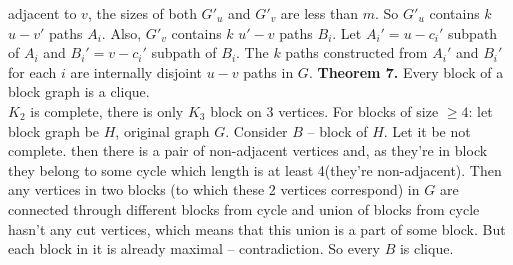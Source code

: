 \documentclass{article}
\begin{document}
	adjacent to $v$, the sizes of both $G'_u$ and $G'_v$ are less than $m$. So $G'_u$ contains $k$ $u-v'$ paths $A_i$. Also, $G'_v$ contains $k$ $u'-v$ paths $B_i$. Let $A_i' = u - c_i'$ subpath of $A_i$ and $B_i' = v - c_i'$ subpath of $B_i$. The $k$ paths constructed from $A_i'$ and $B_i'$ for each $i$ are internally disjoint $u - v$ paths in $G$.\newpage
	\textbf{Theorem 7.} Every block of a block graph is a clique.\\
	$K_2$ is complete, there is only $K_3$ block on 3 vertices.
	For blocks of size $\geq 4$: let block graph be $H$, original graph $G$. Consider $B$ -- block of $H$. 
	Let it be not complete. then there is a pair of non-adjacent vertices and, as they're in block they belong to some cycle which length is at least 4(they're non-adjacent). Then any vertices in two blocks (to which these 2 vertices correspond) in $G$ are connected through different blocks from cycle and union of blocks from cycle hasn't any cut vertices, which means that this union is a part of some block. But each block in it is already maximal -- contradiction. So every $B$ is clique.
\end{document}
